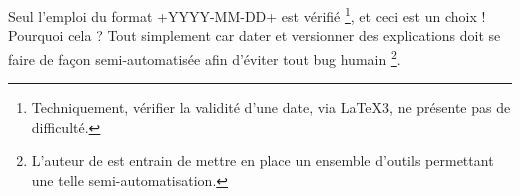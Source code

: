 \begin{bdocwarn}
	Seul l'emploi du format \bdocinlatex+YYYY-MM-DD+ est vérifié
	\footnote{
		Techniquement, vérifier la validité d'une date, via \LaTeX3, ne présente pas de difficulté.
	},
	et ceci est un choix ! Pourquoi cela ? Tout simplement car dater et versionner des explications doit se faire de façon semi-automatisée afin d'éviter tout bug humain
	\footnote{
		L'auteur de  est entrain de mettre en place un ensemble d'outils permettant une telle semi-automatisation.
	}.
\end{bdocwarn}


